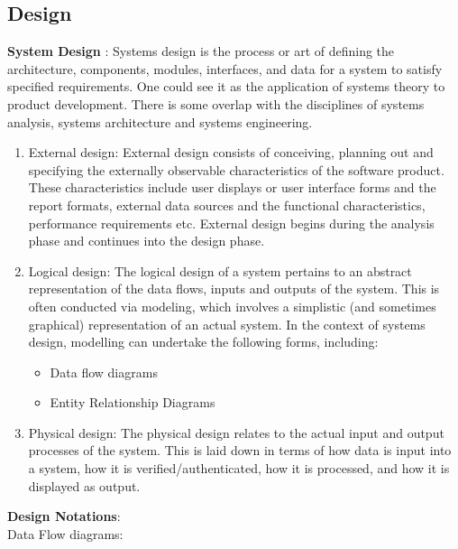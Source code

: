 \subsection{Design}
{\bf System Design} : Systems design is the process or art of defining the architecture, components, modules, interfaces, and data for a system to satisfy specified requirements. One could see it as the application of systems theory to product development. There is some overlap with the disciplines of systems analysis, systems architecture and systems engineering.
\begin{enumerate}
\item  External design: External design consists of conceiving, planning out and specifying the externally observable characteristics of the software product. These characteristics include user displays or user interface forms and the report formats, external data sources and the functional characteristics, performance requirements etc. External design begins during the analysis phase
and continues into the design phase.
\item  Logical design: The logical design of a system pertains to an abstract representation of the data flows, inputs and outputs of the system. This is often conducted via modeling, which involves a simplistic (and sometimes graphical) representation of an actual system. In the context of systems design, modelling can undertake the following forms, including:
\begin{itemize}
\item Data flow diagrams
\item Entity Relationship Diagrams
\end{itemize}
\item  Physical design: The physical design relates to the actual input and output processes of the system. This is laid down in terms of how data is input into a system, how it is verified/authenticated, how it is processed, and how it is displayed as output.
\end{enumerate}
\newpage
{\bf Design Notations}:\\


Data Flow diagrams:


